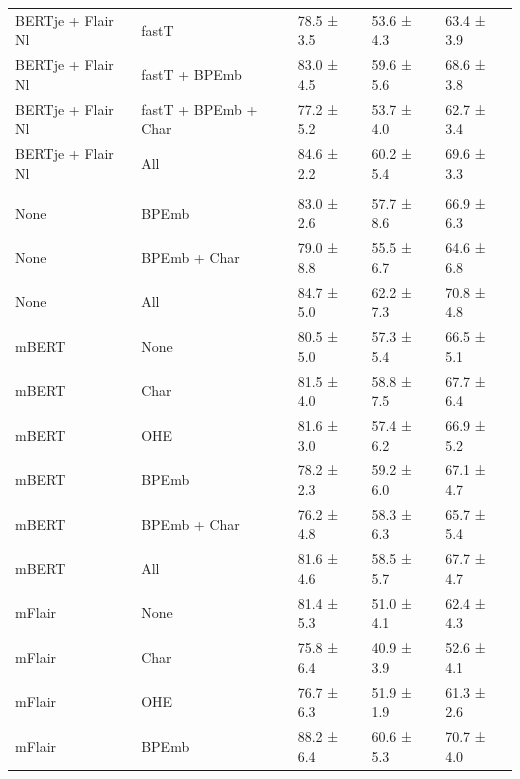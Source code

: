 \documentclass[12pt,a4paper,]{book}
\begin{document}
\begin{longtable}[t]{lllll}
\hspace{1em}BERTje + Flair Nl & fastT & 78.5 ±  3.5 & 53.6 ±  4.3 & 63.4 ±  3.9\\
\hspace{1em}BERTje + Flair Nl & fastT + BPEmb & 83.0 ±  4.5 & 59.6 ±  5.6 & 68.6 ±  3.8\\
\hspace{1em}BERTje + Flair Nl & fastT + BPEmb + Char & 77.2 ±  5.2 & 53.7 ±  4.0 & 62.7 ±  3.4\\
\hspace{1em}BERTje + Flair Nl & All & 84.6 ±  2.2 & 60.2 ±  5.4 & 69.6 ±  3.3\\
\addlinespace[0.3em]
\multicolumn{5}{l}{\textbf{Multilingual embeddings}}\\
\hspace{1em}None & BPEmb & 83.0 ±  2.6 & 57.7 ±  8.6 & 66.9 ±  6.3\\
\hspace{1em}None & BPEmb + Char & 79.0 ±  8.8 & 55.5 ±  6.7 & 64.6 ±  6.8\\
\hspace{1em}None & All & 84.7 ±  5.0 & 62.2 ±  7.3 & 70.8 ±  4.8\\
\hspace{1em}mBERT & None & 80.5 ±  5.0 & 57.3 ±  5.4 & 66.5 ±  5.1\\
\hspace{1em}mBERT & Char & 81.5 ±  4.0 & 58.8 ±  7.5 & 67.7 ±  6.4\\
\hspace{1em}mBERT & OHE & 81.6 ±  3.0 & 57.4 ±  6.2 & 66.9 ±  5.2\\
\hspace{1em}mBERT & BPEmb & 78.2 ±  2.3 & 59.2 ±  6.0 & 67.1 ±  4.7\\
\hspace{1em}mBERT & BPEmb + Char & 76.2 ±  4.8 & 58.3 ±  6.3 & 65.7 ±  5.4\\
\hspace{1em}mBERT & All & 81.6 ±  4.6 & 58.5 ±  5.7 & 67.7 ±  4.7\\
\hspace{1em}mFlair & None & 81.4 ±  5.3 & 51.0 ±  4.1 & 62.4 ±  4.3\\
\hspace{1em}mFlair & Char & 75.8 ±  6.4 & 40.9 ±  3.9 & 52.6 ±  4.1\\
\hspace{1em}mFlair & OHE & 76.7 ±  6.3 & 51.9 ±  1.9 & 61.3 ±  2.6\\
\hspace{1em}mFlair & BPEmb & 88.2 ±  6.4 & 60.6 ±  5.3 & 70.7 ±  4.0\\

\end{longtable}
\end{document}
